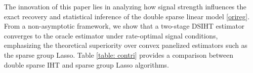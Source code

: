 \documentclass[12pt]{article}
\begin{document}
The innovation of this paper lies in analyzing how signal strength influences the exact recovery and statistical inference of the double sparse linear model \eqref{orireg}. 
From a non-asymptotic framework, we show that a two-stage DSIHT estimator converges to the oracle estimator under rate-optimal signal conditions, emphasizing the theoretical superiority over convex panelized estimators such as the sparse group Lasso. 
Table \ref{table: contri} provides a comparison between double sparse IHT and sparse group Lasso algorithms.

\begin{table}[t]
\caption{Comparison of Sparse group lasso and Double sparse IHT algorithms in the double sparse model.}
\label{table: contri}
\end{table}

\end{document}
